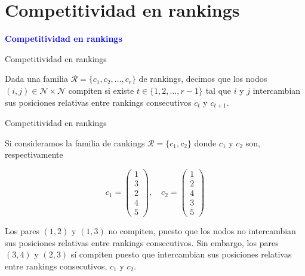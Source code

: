 \documentclass[10pt]{beamer}
\begin{document}
	
	\section{Competitividad en rankings}
	
	\begin{frame}
		\begin{center}
			\Huge\textbf{\textsf{\textcolor{blue}{Competitividad en rankings}}}
		\end{center}
	\end{frame}
	
	\begin{frame}{Competitividad en rankings}
		\begin{defi}
			Dada una familia $\mathcal{R} = \{c_1, c_2, \dots, c_r\}$ de rankings, decimos que los nodos $(i,j) \in \mathcal{N} \times \mathcal{N}$ compiten si existe $t \in \{1,2,\dots, r-1\}$ tal que $i$ y $j$ intercambian sus posiciones relativas entre rankings consecutivos $c_t$ y $c_{t+1}$.
		\end{defi}
	\end{frame}
	
	\begin{frame}{Competitividad en rankings}
		\begin{ejemplo}
			Si consideramos la familia de rankings $\mathcal{R} = \{c_1, c_2\}$ donde $c_1$ y $c_2$ son, respectivamente
			
			\begin{equation*}
			c_1 = \left( \begin{array}{c}
			1\\
			3\\
			2\\
			4\\
			5
			\end{array} \right), \quad
			c_2 = \left( \begin{array}{c}
			1\\
			2\\
			4\\
			3\\
			5
			\end{array} \right)
			\end{equation*}
			
			Los pares $(1,2)$ y $(1,3)$ no compiten, puesto que los nodos no intercambian sus posiciones relativas entre rankings consecutivos. Sin embargo, los pares $(3,4)$ y $(2,3)$ sí compiten puesto que intercambian sus posiciones relativas entre rankings consecutivos, $c_1$ y $c_2$.
		\end{ejemplo}
	\end{frame}
	
\end{document}
